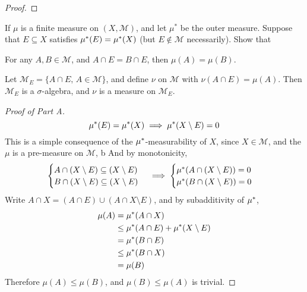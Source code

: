\documentclass[../../main.tex]{subfiles}
\begin{document}
%

\begin{wts}
    
\end{wts}
\begin{proof}
    
\end{proof}
\newpage

%

\newpage
{}
\begin{wts}
    If $\mu$ is a finite measure on $(X,\mathcal{M})$, and let $\mu^*$ be the outer measure. Suppose that $E\subseteq X$ satisfies $\mu^*(E)=\mu^*(X)$ (but $E\notin \mathcal{M}$ necessarily). Show that
    \begin{enumalpha}
        \item For any $A,B\in\mathcal{M}$, and $A\cap E = B\cap E$, then $\mu(A)=\mu(B)$.
        \item Let $\mathcal{M}_E=\{A\cap E,\,A\in\mathcal{M}\}$, and define $\nu$ on $\mathcal{M}$ with $\nu(A\cap E)=\mu(A)$. Then $\mathcal{M}_E$ is a $\sigma$-algebra, and $\nu$ is a measure on $\mathcal{M}_E$.
    \end{enumalpha}
\end{wts}
\begin{proof}[Proof of Part A]
\[
\mu^*(E)=\mu^*(X)\implies \mu^*(X\setminus E)=0
\]
This is a simple consequence of the $\mu^*$-measurability of $X$, since $X\in\mathcal{M}$, and the $\mu$ is a pre-measure on $\mathcal{M}$, b
And by monotonicity, 
\[
\begin{cases}A\cap (X\setminus E)\subseteq (X\setminus E)\\ B\cap (X\setminus E)\subseteq (X\setminus E)\end{cases}\implies\begin{cases}\mu^*(A\cap (X\setminus E))=0\\
\mu^*(B\cap (X\setminus E))=0\end{cases}
\]
Write $A\cap X = (A\cap E)\cup (A\cap X\setminus E)$, and by subadditivity of $\mu^*$,
\begin{align*}
\mu(A)&=\mu^*(A\cap X)\\
&\leq \mu^*(A\cap E)+\mu^*(X\setminus E)\\
&=\mu^*(B\cap E)\\
&\leq \mu^*(B\cap X)\\
&=\mu(B)
\end{align*}
Therefore $\mu(A)\leq \mu(B)$, and $\mu(B)\leq \mu(A)$ is trivial. 

\end{proof}
\end{document}

